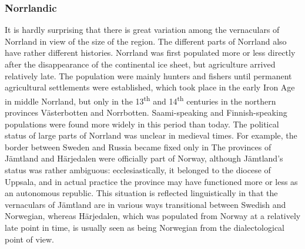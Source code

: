 \subsubsection[Norrlandic]{\rmfamily Norrlandic}
It is hardly surprising that there is great variation among the vernaculars of Norrland in view of the size of the region. The different parts of Norrland also have rather different histories. Norrland was first populated more or less directly after the disappearance of the continental ice sheet, but agriculture arrived relatively late. The population were mainly hunters and fishers until permanent agricultural settlements were established, which took place in the early Iron Age in middle Norrland, but only in the 13\textsuperscript{th} and 14\textsuperscript{th} centuries in the northern provinces Västerbotten and Norrbotten. Saami-speaking and Finnish-speaking populations were found more widely in this period than today. The political status of large parts of Norrland was unclear in medieval times. For example, the border between Sweden and Russia became fixed only in  The provinces of Jämtland and Härjedalen were officially part of Norway, although Jämtland’s status was rather ambiguous: ecclesiastically, it belonged to the diocese of Uppsala, and in actual practice the province may have functioned more or less as an autonomous republic. This situation is reflected linguistically in that the vernaculars of Jämtland are in various ways transitional between Swedish and Norwegian, whereas Härjedalen, which was populated from Norway at a relatively late point in time, is usually seen as being Norwegian from the dialectological point of view.


